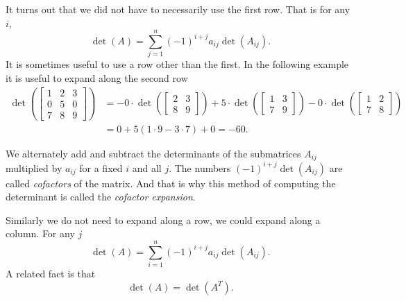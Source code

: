 It turns out that we did not have to necessarily use the first row.  That is
for any $i$,
\begin{equation*}
\det (A)
=
\sum_{j=1}^n
{(-1)}^{i+j}
a_{ij} \det (A_{ij}) .
\end{equation*}
It is sometimes useful to use a row other than the first.  In the following
example it is useful to expand along the second row
\begin{equation*}
\begin{split}
\det \left(
\begin{bmatrix}
1 & 2 & 3 \\
0 & 5 & 0 \\
7 & 8 & 9
\end{bmatrix}
\right)
& =
- 0 \cdot
\det \left(
\begin{bmatrix}
2 & 3 \\
8 & 9
\end{bmatrix}
\right)
+
5 \cdot
\det \left(
\begin{bmatrix}
1 & 3 \\
7 & 9
\end{bmatrix}
\right)
-
0 \cdot
\det \left(
\begin{bmatrix}
1 & 2 \\
7 & 8
\end{bmatrix}
\right) \\
& =
0
+
5 (1 \cdot 9 - 3 \cdot 7)
+
0
= -60 .
\end{split}
\end{equation*}

We alternately add and subtract the determinants of the submatrices
$A_{ij}$ multiplied by $a_{ij}$ for a fixed $i$ and all $j$.
The numbers ${(-1)}^{i+j}\det(A_{ij})$ are called
\emph{cofactors}
of the matrix.  And that is why
this method of computing the determinant is called the
\emph{cofactor expansion}.

Similarly we do not need to expand along a row, we could expand
along a column.  For any $j$
\begin{equation*}
\det (A)
=
\sum_{i=1}^n
{(-1)}^{i+j}
a_{ij} \det (A_{ij}) .
\end{equation*}
A related fact is that
\begin{equation*}
\det (A) = \det (A^T) .
\end{equation*}

\medskip

